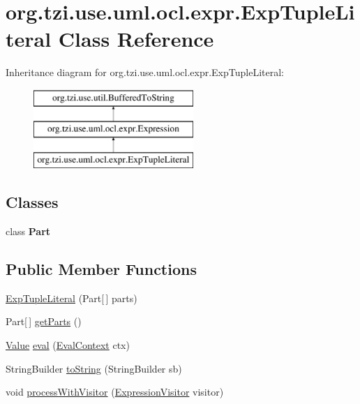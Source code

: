\hypertarget{classorg_1_1tzi_1_1use_1_1uml_1_1ocl_1_1expr_1_1_exp_tuple_literal}{\section{org.\-tzi.\-use.\-uml.\-ocl.\-expr.\-Exp\-Tuple\-Literal Class Reference}
\label{classorg_1_1tzi_1_1use_1_1uml_1_1ocl_1_1expr_1_1_exp_tuple_literal}
}
Inheritance diagram for org.\-tzi.\-use.\-uml.\-ocl.\-expr.\-Exp\-Tuple\-Literal\-:\begin{figure}[H]
\begin{center}
\leavevmode
\includegraphics[height=3.000000cm]{classorg_1_1tzi_1_1use_1_1uml_1_1ocl_1_1expr_1_1_exp_tuple_literal}
\end{center}
\end{figure}
\subsection*{Classes}
\begin{DoxyCompactItemize}
\item 
class {\bfseries Part}
\end{DoxyCompactItemize}
\subsection*{Public Member Functions}
\begin{DoxyCompactItemize}
\item 
\hyperlink{classorg_1_1tzi_1_1use_1_1uml_1_1ocl_1_1expr_1_1_exp_tuple_literal_a7b6917c78ee0f3395f1f4478f0470206}{Exp\-Tuple\-Literal} (Part\mbox{[}$\,$\mbox{]} parts)
\item 
Part\mbox{[}$\,$\mbox{]} \hyperlink{classorg_1_1tzi_1_1use_1_1uml_1_1ocl_1_1expr_1_1_exp_tuple_literal_a520477b115376ad4aa62f083464cb2e6}{get\-Parts} ()
\item 
\hyperlink{classorg_1_1tzi_1_1use_1_1uml_1_1ocl_1_1value_1_1_value}{Value} \hyperlink{classorg_1_1tzi_1_1use_1_1uml_1_1ocl_1_1expr_1_1_exp_tuple_literal_a5f5ace3470136c5fed40334f109c31e7}{eval} (\hyperlink{classorg_1_1tzi_1_1use_1_1uml_1_1ocl_1_1expr_1_1_eval_context}{Eval\-Context} ctx)
\item 
String\-Builder \hyperlink{classorg_1_1tzi_1_1use_1_1uml_1_1ocl_1_1expr_1_1_exp_tuple_literal_aaabfea3864ab279979ffe3ccc7017cf9}{to\-String} (String\-Builder sb)
\item 
void \hyperlink{classorg_1_1tzi_1_1use_1_1uml_1_1ocl_1_1expr_1_1_exp_tuple_literal_a2cdb00be370fa1aab0b49fbaea9f2582}{process\-With\-Visitor} (\hyperlink{interfaceorg_1_1tzi_1_1use_1_1uml_1_1ocl_1_1expr_1_1_expression_visitor}{Expression\-Visitor} visitor)
\end{DoxyCompactItemize}
